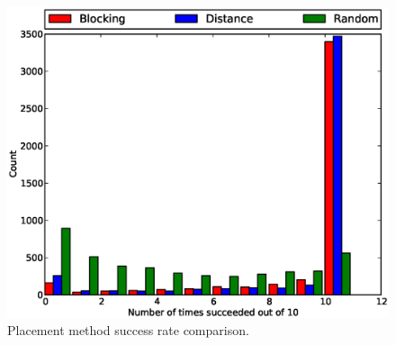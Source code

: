\begin{figure}[H]
\begin{center}
\includegraphics[width=\textwidth]{Images/placement_success_comparison.eps}
\caption[Placement method success rate comparison]{Placement method success rate
comparison.}
\label{fig:placement_success}
\end{center}
\end{figure}


